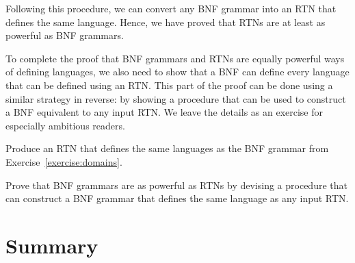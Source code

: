 {Following this procedure, we can convert any BNF grammar into an RTN that defines the same language.  Hence, we have proved that RTNs are at least as powerful as BNF grammars.

To complete the proof that BNF grammars and RTNs are equally powerful ways of defining languages, we also need to show that a BNF can define every language that can be defined using an RTN.  This part of the proof can be done using a similar strategy in reverse: by showing a procedure that can be used to construct a BNF equivalent to any input RTN.  We leave the details as an exercise for especially ambitious readers.
}

\beforeex
\begin{exercise} \greenstar 
Produce an RTN that defines the same languages as the BNF grammar from Exercise~\ref{exercise:domains}.
\end{exercise}
\afterex

\beforeex
\begin{exercise} \goldstar
Prove that BNF grammars are as powerful as RTNs by devising a procedure that can construct a BNF grammar that defines the same language as any input RTN.
\solution{\LATER{}}
\end{exercise}
\afterex

\section{Summary}

